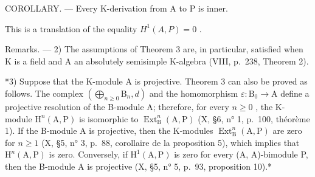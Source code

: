 COROLLARY. --- Every K-derivation from A to P is inner.

This is a translation of the equality \(H^{1}(A,P)=0\) .

Remarks. --- 2) The assumptions of Theorem 3 are, in particular, satisfied when K is a field and A an absolutely semisimple K-algebra (VIII, p.~238, Theorem 2).

*3) Suppose that the K-module A is projective. Theorem 3 can also be proved as follows. The complex \((\bigoplus_{n\geqslant 0}\mathrm{B}_n,d)\) and the homomorphism \(\varepsilon :\mathrm{B}_0\to \mathrm{A}\) define a projective resolution of the B-module A; therefore, for every \(n\geqslant 0\) , the K-module \(\mathrm{H}^n (\mathrm{A},\mathrm{P})\) is isomorphic to \(\operatorname {Ext}_{\mathrm{B}}^{n}(\mathrm{A},\mathrm{P})\) (X, §6, n° 1, p.~100, théorème 1). If the B-module A is projective, then the K-modules \(\operatorname {Ext}_{\mathrm{B}}^{n}(\mathrm{A},\mathrm{P})\) are zero for \(n\geqslant 1\) (X, §5, n° 3, p.~88, corollaire de la proposition 5), which implies that \(\mathrm{H}^n (\mathrm{A},\mathrm{P})\) is zero. Conversely, if \(\mathrm{H}^1 (\mathrm{A},\mathrm{P})\) is zero for every (A, A)-bimodule P, then the B-module A is projective (X, §5, n° 5, p.~93, proposition 10).*

